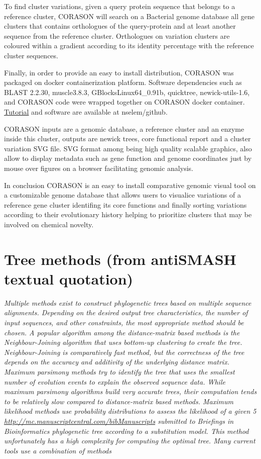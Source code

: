\documentclass[12pt,twoside]{reedthesis}
\begin{document}
  To find cluster variations, given a query protein sequence that belongs
  to a reference cluster, CORASON will search on a Bacterial genome
  database all gene clusters that contains orthologues of the
  query-protein and at least another sequence from the reference cluster.
  Orthologues on variation clusters are coloured within a gradient
  according to its identity percentage with the reference cluster
  sequences.
  
  Finally, in order to provide an easy to install distribution, CORASON
  was packaged on docker containerization platform. Software dependencies
  such as BLAST 2.2.30, muscle3.8.3, GBlocksLinux64\_0.91b, quicktree,
  newick-utils-1.6, and CORASON code were wrapped together on CORASON
  docker container.
  \href{https://github.com/nselem/EvoDivMet/wiki}{Tutorial} and software
  are available at nselem/github.
  
  CORASON inputs are a genomic database, a reference cluster and an enzyme
  inside this cluster, outputs are newick trees, core functional report
  and a cluster variation SVG file. SVG format among being high quality
  scalable graphics, also allow to display metadata such as gene function
  and genome coordinates just by mouse over figures on a browser
  facilitating genomic analysis.
  
  In conclusion CORASON is an easy to install comparative genomic visual
  tool on a customizable genome database that allows users to visualice
  variations of a reference gene cluster identifing its core functions and
  finally sorting variations according to their evolutionary history
  helping to prioritize clusters that may be involved on chemical novelty.
  
  \section{Tree methods (from antiSMASH textual
  quotation)}\label{tree-methods-from-antismash-textual-quotation}
  
  \emph{Multiple methods exist to construct phylogenetic trees based on
  multiple sequence alignments. Depending on the desired output tree
  characteristics, the number of input sequences, and other constraints,
  the most appropriate method should be chosen. A popular algorithm among
  the distance-matrix based methods is the Neighbour-Joining algorithm
  that uses bottom-up clustering to create the tree. Neighbour-Joining is
  comparatively fast method, but the correctness of the tree depends on
  the accuracy and additivity of the underlying distance matrix. Maximum
  parsimony methods try to identify the tree that uses the smallest number
  of evolution events to explain the observed sequence data. While maximum
  parsimony algorithms build very accurate trees, their computation tends
  to be relatively slow compared to distance-matrix based methods. Maximum
  likelihood methods use probability distributions to assess the
  likelihood of a given 5
  \url{http://mc.manuscriptcentral.com/bibManuscripts} submitted to
  Briefings in Bioinformatics phylogenetic tree according to a
  substitution model. This method unfortunately has a high complexity for
  computing the optimal tree. Many current tools use a combination of
  methods}
  
\end{document}
